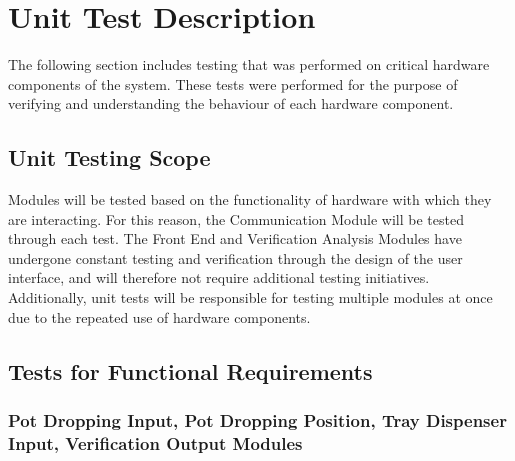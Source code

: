 \documentclass[12pt, titlepage]{article}
\begin{document}
\newpage

\section{Unit Test Description}

The following section includes testing that was performed on critical hardware
components of the system. These tests were performed for the purpose
of verifying and understanding the behaviour of each hardware component.

\subsection{Unit Testing Scope}

Modules will be tested based on the functionality of hardware with which they are interacting. 
For this reason, the Communication Module will be tested through each test. The Front End and Verification Analysis Modules have 
undergone constant testing and verification through the design of the user interface, and will therefore not require 
additional testing initiatives. Additionally, unit tests will be responsible for testing multiple modules at once due 
to the repeated use of hardware components.

\subsection{Tests for Functional Requirements}

\indent \subsubsection{Pot Dropping Input, Pot Dropping Position, Tray Dispenser Input, Verification Output Modules}
\end{document}

